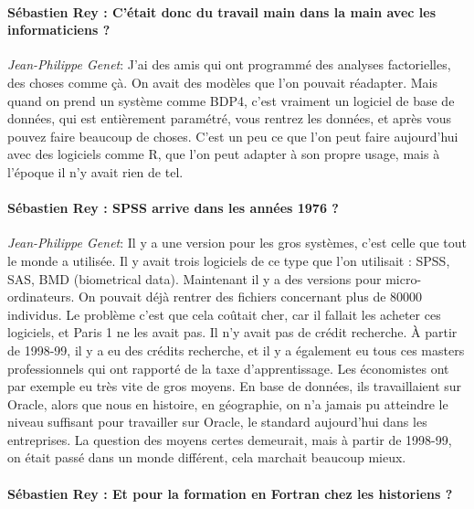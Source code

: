 \paragraph*{Sébastien Rey : C'était donc du travail main dans la main avec les informaticiens ?}

\noindent\emph{Jean-Philippe Genet}: J'ai des amis qui ont programmé des analyses factorielles, des choses comme çà. On avait des modèles que l'on pouvait réadapter. Mais quand on prend un système comme BDP4, c'est vraiment un logiciel de base de données, qui est entièrement paramétré, vous rentrez les données, et après vous pouvez faire beaucoup de choses. C'est un peu ce que l'on peut faire aujourd'hui avec des logiciels comme R, que l'on peut adapter à son propre usage, mais à l'époque il n'y avait rien de tel. 

\paragraph*{Sébastien Rey : SPSS arrive dans les années 1976 ? }

\noindent\emph{Jean-Philippe Genet}: Il y a une version pour les gros systèmes, c'est celle que tout le monde a utilisée. Il y avait trois logiciels de ce type que l'on utilisait : SPSS, SAS, BMD (biometrical data). Maintenant il y a des versions pour micro-ordinateurs. On pouvait déjà rentrer des fichiers concernant plus de 80000 individus. Le problème c'est que cela coûtait cher, car il fallait les acheter ces logiciels, et Paris 1 ne les avait pas. Il n'y avait pas de crédit recherche. À partir de 1998-99, il y a eu des crédits recherche, et il y a également eu tous ces masters professionnels qui ont rapporté de la taxe d'apprentissage. Les économistes ont par exemple eu très vite de gros moyens. En base de données, ils travaillaient sur Oracle, alors que nous en histoire, en géographie, on n’a jamais pu atteindre le niveau suffisant pour travailler sur Oracle, le standard aujourd'hui dans les entreprises. La question des moyens certes demeurait, mais à partir de 1998-99, on était passé dans un monde différent, cela marchait beaucoup mieux.

\paragraph*{Sébastien Rey : Et pour la formation en Fortran chez les historiens ? } 

